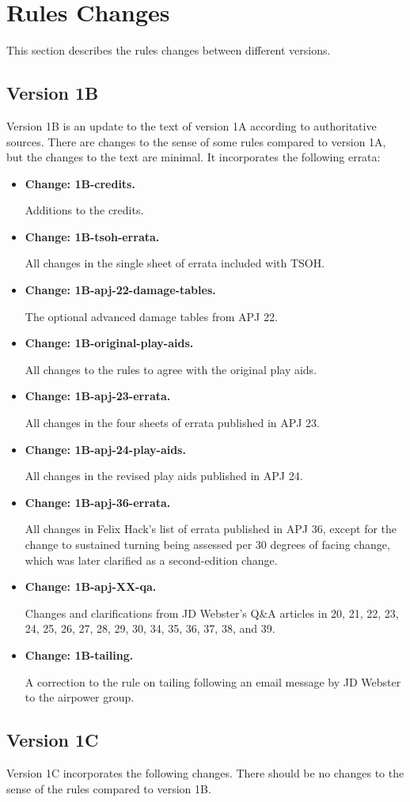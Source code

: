 \documentclass[10pt]{article}
\newcommand{\itemtag}[1]{\item \textbf{Change: #1.}\par}
\begin{document}

\section{Rules Changes}

This section describes the rules changes between different versions.

\subsection{Version 1B}

Version 1B is an update to the text of version 1A according to authoritative sources. There are changes to the sense of some rules compared to version 1A, but the changes to the text are minimal. It incorporates the following errata:

\begin{itemize}
    \itemtag{1B-credits} Additions to the credits.
    \itemtag{1B-tsoh-errata} All changes in the single sheet of errata included with TSOH.
    \itemtag{1B-apj-22-damage-tables} The optional advanced damage tables from APJ 22.
    \itemtag{1B-original-play-aids} All changes to the rules to agree with the original play aids.
    \itemtag{1B-apj-23-errata} All changes in the four sheets of errata published in APJ 23.
    \itemtag{1B-apj-24-play-aids} All changes in the revised play aids published in APJ 24. 
    \itemtag{1B-apj-36-errata} All changes in Felix Hack’s list of errata published in APJ 36, except for the change to sustained turning being assessed per 30 degrees of facing change, which was later clarified as a second-edition change.
    \itemtag{1B-apj-XX-qa} Changes and clarifications from JD Webster’s Q\&A articles in {\APJ} 20, 21, 22, 23, 24, 25, 26, 27, 28, 29, 30, 34, 35, 36, 37, 38, and 39.
    \itemtag{1B-tailing} A correction to the rule on tailing following an email message by JD Webster to the airpower group. 
\end{itemize}

\subsection{Version 1C}

Version 1C incorporates the following changes. There should be no changes to the sense of the rules compared to version 1B.
\end{document}
